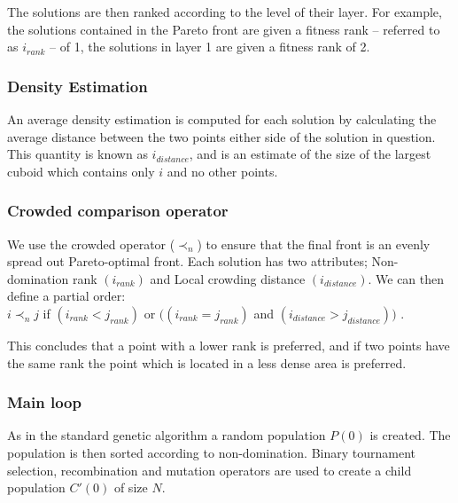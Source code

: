 \documentclass[10pt, conference, compsocconf]{IEEEtran}
\begin{document}
The solutions are then ranked according to the level of their layer. For example, the solutions contained in the Pareto front are given a fitness rank -- referred to as $i_{rank}$ -- of 1, the solutions in layer 1 are given a fitness rank of 2.


\subsubsection{Density Estimation}

An average density estimation is computed for each solution by calculating the average distance between the two points either side of the solution in question. This quantity is known as $i_{distance}$, and is an estimate of the size of the largest cuboid which contains only $i$ and no other points. 

\subsubsection{Crowded comparison operator}
We use the crowded operator ($\prec_n$) to ensure that the final front is an evenly spread out Pareto-optimal front. Each solution has two attributes; Non-domination rank $(i_{rank})$ and Local crowding distance $(i_{distance})$. 
We can then define a partial order:\\	
$i\prec_nj$ if $(i_{rank}<j_{rank})$ or $((i_{rank}=j_{rank})$ and $(i_{distance}>j_{distance}))$ \cite{Valkanas2014}.

This concludes that a point with a lower rank is preferred, and if two points have the same rank the point which is located in a less dense area is preferred.

\subsubsection{Main loop}
As in the standard genetic algorithm a random population $P(0)$ is created. The population is then  sorted according to non-domination. Binary tournament selection, recombination and mutation operators are used to create a child population $C'(0)$ of size $N$. 
\end{document}
